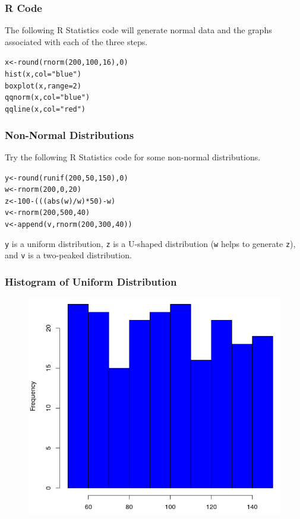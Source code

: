\documentclass[xcolor=dvipsnames]{beamer}
\begin{document}
\begin{frame}
  \frametitle{R Code}
  The following R Statistics code will generate normal data and
  the graphs associated with each of the three steps.
\begin{alltt}
x<-round(rnorm(200,100,16),0)\newline
hist(x,col="blue")\newline
boxplot(x,range=2)\newline
qqnorm(x,col="blue")\newline
qqline(x,col="red")
\end{alltt}
\end{frame}

\begin{frame}
  \frametitle{Non-Normal Distributions}
  Try the following R Statistics code for some non-normal
  distributions.
\begin{alltt}
y<-round(runif(200,50,150),0)\newline
w<-rnorm(200,0,20)\newline
z<-100-(((abs(w)/w)*50)-w)\newline
v<-rnorm(200,500,40)\newline
v<-append(v,rnorm(200,300,40))
\end{alltt}
\texttt{y} is a uniform distribution, \texttt{z} is a U-shaped
distribution (\texttt{w} helps to generate \texttt{z}), and \texttt{v}
is a two-peaked distribution.
\end{frame}

\begin{frame}
  \frametitle{Histogram of Uniform Distribution}
\begin{figure}[h]
\includegraphics[scale=.4]{./diagrams/an-histunif.png}
\end{figure}
\end{frame}
\end{document}
